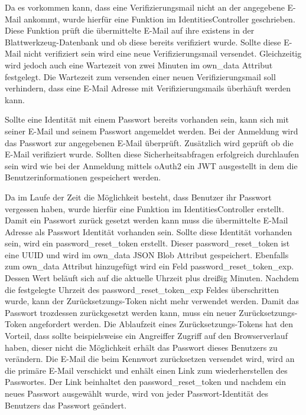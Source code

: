 \documentclass[paper=a4,fontsize=12pt,parskip=half]{scrartcl}
\begin{document}
\begin{description}
		Da es vorkommen kann, dass eine Verifizierungsmail nicht an der angegebene E-Mail ankommt, wurde hierfür eine Funktion im IdentitiesController geschrieben. Diese Funktion prüft die übermittelte E-Mail auf ihre existens in der Blattwerkzeug-Datenbank und ob diese bereits verifiziert wurde. Sollte diese E-Mail nicht verifiziert sein wird eine neue Verifizierungsmail versendet. Gleichzeitig wird jedoch auch eine Wartezeit von zwei Minuten im own\_data Attribut festgelegt. Die Wartezeit zum versenden einer neuen Verifizierungsmail soll verhindern, dass eine E-Mail Adresse mit Verifizierungsmails überhäuft werden kann.
		
		Sollte eine Identität mit einem Passwort bereits vorhanden sein, kann sich mit seiner E-Mail und seinem Passwort angemeldet werden. Bei der Anmeldung wird das Passwort zur angegebenen E-Mail überprüft. Zusätzlich wird geprüft ob die E-Mail verifiziert wurde. Sollten diese Sicherheitsabfragen erfolgreich durchlaufen sein wird wie bei der Anmeldung mittels \gls{oAuth2} ein \gls{JWT} ausgestellt in dem die Benutzerinformationen gespeichert werden.
		
		Da im Laufe der Zeit die Möglichkeit besteht, dass Benutzer ihr Passwort vergessen haben, wurde hierfür eine Funktion im IdentitiesController erstellt. Damit ein Passwort zurück gesetzt werden kann muss die übermittelte E-Mail Adresse als Passwort Identität vorhanden sein. Sollte diese Identität vorhanden sein, wird ein password\_reset\_token erstellt. Dieser password\_reset\_token ist eine \gls{UUID} und wird im own\_data JSON Blob Attribut gespeichert. Ebenfalls zum own\_data Attribut hinzugefügt wird ein Feld password\_reset\_token\_exp. Dessen Wert beläuft sich auf die aktuelle Uhrzeit plus dreißig Minuten. Nachdem die festgelegte Uhrzeit des password\_reset\_token\_exp Feldes überschritten wurde, kann der Zurücksetzungs-Token nicht mehr verwendet werden. Damit das Passwort trozdessen zurückgesetzt werden kann, muss ein neuer Zurücksetzungs-Token angefordert werden. Die Ablaufzeit eines Zurücksetzungs-Tokens hat den Vorteil, dass sollte beispielsweise ein Angreiffer Zugriff auf den Browserverlauf haben, dieser nicht die Möglichkeit erhält das Passwort dieses Benutzers zu verändern. Die E-Mail die beim Kennwort zurücksetzen versendet wird, wird an die primäre E-Mail verschickt und enhält einen Link zum wiederherstellen des Passwortes. Der Link beinhaltet den password\_reset\_token und nachdem ein neues Passwort ausgewählt wurde, wird von jeder Passwort-Identität des Benutzers das Passwort geändert. 
	\end{description}
	
\end{document}
